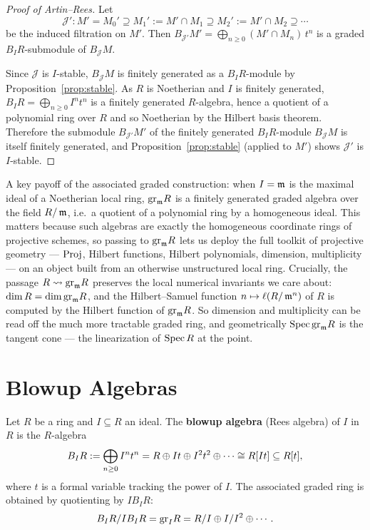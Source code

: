 \documentclass[11pt]{article}
\begin{document}
\begin{proof}[Proof of Artin--Rees]
    Let
    \[\mathcal{J}' : M' = M_0' \supseteq M_1' := M' \cap M_1 \supseteq M_2' := M' \cap M_2 \supseteq \cdots\]
    be the induced filtration on $M'$. Then $B_{\mathcal{J}'}M' = \bigoplus_{n \geq 0} (M' \cap M_n)\,t^n$ is a graded $B_I R$-submodule of $B_{\mathcal{J}}M$.

    Since $\mathcal{J}$ is $I$-stable, $B_{\mathcal{J}}M$ is finitely generated as a $B_I R$-module by Proposition~\ref{prop:stable}. As $R$ is Noetherian and $I$ is finitely generated, $B_I R = \bigoplus_{n \geq 0} I^n t^n$ is a finitely generated $R$-algebra, hence a quotient of a polynomial ring over $R$ and so Noetherian by the Hilbert basis theorem. Therefore the submodule $B_{\mathcal{J}'}M'$ of the finitely generated $B_I R$-module $B_{\mathcal{J}}M$ is itself finitely generated, and Proposition~\ref{prop:stable} (applied to $M'$) shows $\mathcal{J}'$ is $I$-stable.
\end{proof}

\begin{remark}
    A key payoff of the associated graded construction: when $I = \operatorname{\mathfrak{m}}$ is the maximal ideal of a Noetherian local ring, $\text{gr}_{\operatorname{\mathfrak{m}}} R$ is a finitely generated {graded} algebra over the field $R/\operatorname{\mathfrak{m}}$, i.e.\ a quotient of a polynomial ring by a homogeneous ideal. This matters because such algebras are exactly the homogeneous coordinate rings of projective schemes, so passing to $\text{gr}_{\operatorname{\mathfrak{m}}} R$ lets us deploy the full toolkit of projective geometry --- $\text{Proj}$, Hilbert functions, Hilbert polynomials, dimension, multiplicity --- on an object built from an otherwise unstructured local ring. Crucially, the passage $R \rightsquigarrow \text{gr}_{\operatorname{\mathfrak{m}}} R$ preserves the local numerical invariants we care about: $\dim R = \dim \text{gr}_{\operatorname{\mathfrak{m}}} R$, and the Hilbert--Samuel function $n \mapsto \ell(R/\operatorname{\mathfrak{m}}^n)$ of $R$ is computed by the Hilbert function of $\text{gr}_{\operatorname{\mathfrak{m}}} R$. So dimension and multiplicity can be read off the much more tractable graded ring, and geometrically $\operatorname{Spec} \text{gr}_{\operatorname{\mathfrak{m}}} R$ is the tangent cone --- the linearization of $\operatorname{Spec} R$ at the point.
\end{remark}

\newpage

\section{Blowup Algebras}

\begin{definition}
    Let $R$ be a ring and $I \subseteq R$ an ideal. The \textbf{blowup algebra} (Rees algebra) of $I$ in $R$ is the $R$-algebra
    \[B_I R := \bigoplus_{n \geq 0} I^n t^n = R \oplus It \oplus I^2t^2 \oplus \cdots \cong R[It] \subseteq R[t],\]
    where $t$ is a formal variable tracking the power of $I$. The associated graded ring is obtained by quotienting by $IB_IR$:
    \[B_I R / I B_I R = \text{gr}_I R = R/I \oplus I/I^2 \oplus \cdots.\]
\end{definition}
\end{document}
